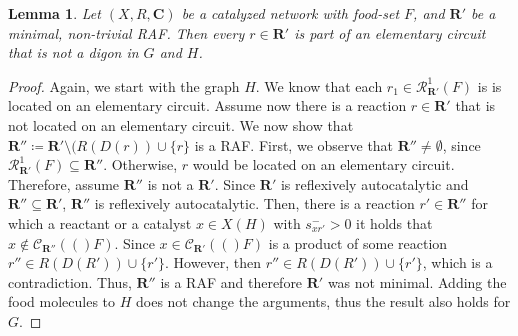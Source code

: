 \documentclass[pdflatex]{sn-jnl}
\theoremstyle{thmstyleone}%
\newtheorem{lemma}[theorem]{Lemma}%
\theoremstyle{examplesty}%
\theoremstyle{thmstylethree}%
\newcommand{\closure}[2]{\mathscr{C}_{#1}(#2)}
\newcommand{\RAF}[0]{\mathbf{R}'}
\newcommand{\POR}[0]{\mathscr{R}}
\newcommand{\cat}{\mathbf{C}}
\begin{document}
\vspace{6pt}
\begin{lemma}\label{lem:elemCirc}
	Let $(X,R, \cat)$ be a catalyzed network with food-set $F$, and $\RAF$ be a minimal, non-trivial RAF. Then 
	every $r\in \RAF$ is part of an elementary circuit that is not a digon in $G$ and $H$.
\end{lemma}
\begin{proof}
	Again, we start with the graph $H$. We know that each $r_1\in \POR^1_{\RAF}(F)$ is 
	is located on an elementary circuit. Assume now there is a reaction $r\in \RAF$ that is 
	not located on an elementary circuit. We now show that $\RAF' \coloneqq \RAF\setminus 
	(R(D(r))\cup \{r\}$ is a RAF. First, we observe that $\RAF'\neq \emptyset$, since $\POR^1_{\RAF}(F) 
	\subseteq \RAF'$. Otherwise, $r$ would be located on an elementary circuit. Therefore, 
	assume $\RAF'$ is not a $\RAF$. Since $\RAF$ is reflexively autocatalytic and 
	$\RAF'\subseteq \RAF$, $\RAF'$ is reflexively autocatalytic. Then, there is a reaction 
	$r'\in \RAF'$ for which a reactant or a catalyst $x\in X(H)$ with $s^-_{xr'}>0$ it holds that 
	$x\notin \closure{\RAF'}(F)$. Since $x\in \closure{\RAF}(F)$ is a product of some reaction 
	$r''\in R(D(R'))\cup \{r'\}$. However, then $r''\in R(D(R'))\cup \{r'\}$, which is a contradiction. 
	Thus, $\RAF'$ is a RAF and therefore $\RAF$ was not minimal. Adding the food molecules 
	to $H$ does not change the arguments, thus the result also holds for $G$. 		
\end{proof}
\vspace{6pt}
\end{document}
